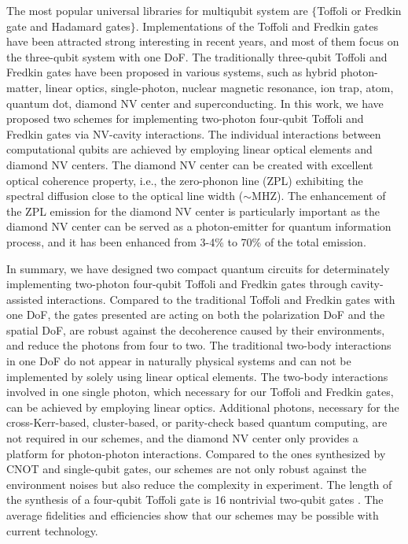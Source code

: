 \documentclass[showpacs,preprintnumbers,showkeys,amsmath,amssymb]{revtex4}%
\begin{document}
The most popular universal libraries for multiqubit system are $\{$Toffoli or Fredkin gate and Hadamard gates$\}$.
Implementations of the Toffoli and Fredkin gates have been attracted strong interesting in recent years, and most of them  focus on the three-qubit system with one DoF. The traditionally three-qubit Toffoli and Fredkin gates have been proposed in various systems, such as hybrid photon-matter\cite{Hyper-Toffoli-Wang,Toffoli-hybrid}, linear optics\cite{Toffoli-linear2}, single-photon\cite{ourphotongate-NV,Toffoli-photon1}, nuclear magnetic resonance\cite{Toffoli-NMR}, ion trap\cite{Toffoli-ion}, atom\cite{Toffoli-atom}, quantum dot\cite{Toffoli-QD1}, diamond NV center\cite{ourgates-NV} and superconducting\cite{Toffoli-super1,Toffoli-super2}.
%
%
%
In this work, we have proposed two schemes for implementing two-photon four-qubit Toffoli and Fredkin gates via NV-cavity interactions. The individual interactions between computational qubits are achieved by employing linear optical elements and diamond NV centers. The diamond NV center can be created with excellent optical coherence property, i.e., the zero-phonon line (ZPL) exhibiting the spectral diffusion close to the optical line width ($\sim$MHZ)\cite{excellent-optical}. The enhancement of the ZPL emission for the diamond NV center is particularly important as the diamond NV center can be served as a photon-emitter for quantum information process, and it has been enhanced from 3-4\%  to 70\% of the total emission\cite{enhancement-ZPL}.



In summary, we have designed two compact quantum circuits for determinately implementing two-photon four-qubit Toffoli and Fredkin gates through cavity-assisted interactions. Compared to the traditional Toffoli and Fredkin gates with one DoF, the gates presented are acting on both the polarization DoF and the spatial DoF, are robust against the decoherence caused by their environments, and reduce the photons from four to two. The traditional two-body interactions in one DoF do not appear in naturally physical systems and can not be implemented by solely using linear optical elements.  The two-body interactions involved in one single photon, which necessary for our Toffoli and Fredkin gates, can be achieved by employing linear optics. Additional photons, necessary for the cross-Kerr-based, cluster-based, or parity-check based quantum computing, are not required in our schemes, and the diamond NV center only provides a platform for photon-photon interactions. Compared to the ones synthesized by CNOT and single-qubit gates, our schemes are not only robust against the environment noises but also reduce the complexity in experiment. The length of the synthesis of a four-qubit Toffoli gate is 16 nontrivial two-qubit gates \cite{Universal}. The average fidelities and efficiencies show that our schemes may be possible with current technology.
\end{document}
